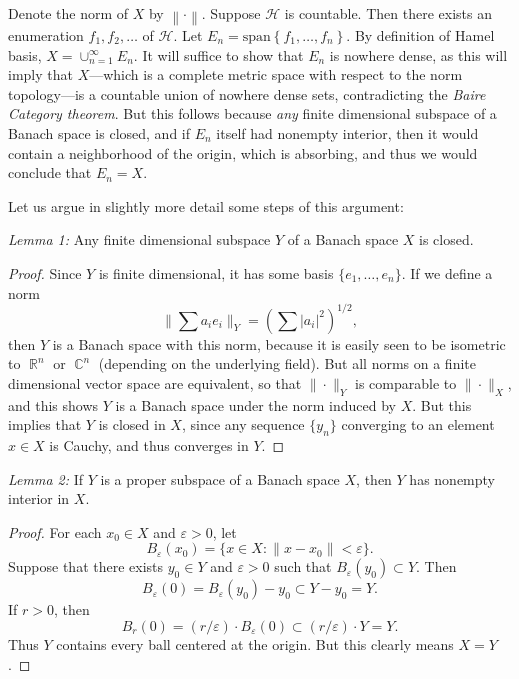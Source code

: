 \documentclass[answers]{exam}
\DeclareMathOperator{\CC}{\mathbb{C}}
\DeclareMathOperator{\RR}{\mathbb{R}}
\theoremstyle{problemstyle}
\newcommand{\norm}[1]{\left\lVert#1\right\rVert} %
\newcommand{\1}[1]{\textbf{1}_{\left[#1\right]}} %
\begin{document}
\begin{questions}
\begin{solution}
  Denote the norm of $X$ by $\norm{\cdot}$. Suppose $\mathcal{H}$ is countable. Then there exists an enumeration $f_{1},f_{2},\ldots$ of $\mathcal{H}$. Let $E_{n}= \text{span}\left\{ f_{1},\ldots,f_{n} \right\}$. By definition of Hamel basis, $X=\cup_{n=1}^{\infty} E_{n}$. It will suffice to show that $E_{n}$ is nowhere dense, as this will imply that $X$---which is a complete metric space with respect to the norm topology---is a countable union of nowhere dense sets, contradicting the \emph{Baire Category theorem}. But this follows because \emph{any} finite dimensional subspace of a Banach space is closed, and if $E_n$ itself had nonempty interior, then it would contain a neighborhood of the origin, which is absorbing, and thus we would conclude that $E_n = X$.

  Let us argue in slightly more detail some steps of this argument:

  \noindent \textit{Lemma 1:} Any finite dimensional subspace $Y$ of a Banach space $X$ is closed.
  \begin{proof}
  	Since $Y$ is finite dimensional, it has some basis $\{ e_1, \dots, e_n \}$. If we define a norm
  	\[ \| \sum a_i e_i \|_Y = \left( \sum |a_i|^2 \right)^{1/2}, \]
  	then $Y$ is a Banach space with this norm, because it is easily seen to be isometric to $\RR^n$ or $\CC^n$ (depending on the underlying field). But all norms on a finite dimensional vector space are equivalent, so that $\| \cdot \|_Y$ is comparable to $\| \cdot \|_X$, and this shows $Y$ is a Banach space under the norm induced by $X$. But this implies that $Y$ is closed in $X$, since any sequence $\{ y_n \}$ converging to an element $x \in X$ is Cauchy, and thus converges in $Y$.
  \end{proof}

  \noindent \textit{Lemma 2:} If $Y$ is a proper subspace of a Banach space $X$, then $Y$ has nonempty interior in $X$.
  \begin{proof}
  	For each $x_0 \in X$ and $\varepsilon > 0$, let
  	\[ B_\varepsilon(x_0) = \{ x \in X: \| x - x_0 \| < \varepsilon \}. \]
  	Suppose that there exists $y_0 \in Y$ and $\varepsilon > 0$ such that $B_\varepsilon(y_0) \subset Y$. Then
  	\[ B_\varepsilon(0) = B_\varepsilon(y_0) - y_0 \subset Y - y_0 = Y. \]
  	If $r > 0$, then
  	\[ B_r(0) = (r / \varepsilon) \cdot B_\varepsilon(0) \subset (r / \varepsilon) \cdot Y = Y. \]
  	Thus $Y$ contains every ball centered at the origin. But this clearly means $X = Y$.
  \end{proof}
\end{solution}


\end{questions}
\end{document}
